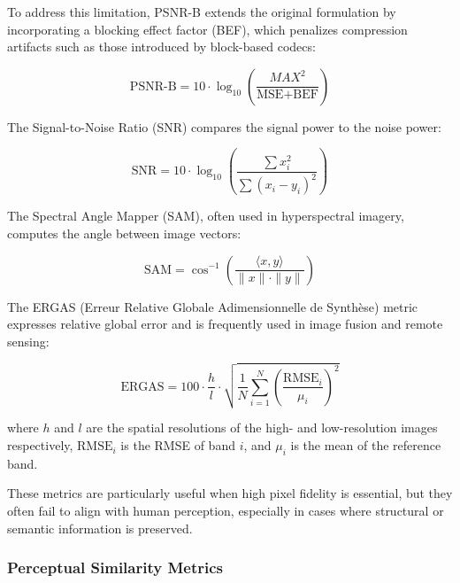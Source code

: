 To address this limitation, PSNR-B extends the original formulation by incorporating a blocking effect factor (BEF), which penalizes compression artifacts such as those introduced by block-based codecs:

\begin{equation}
\text{PSNR-B} = 10 \cdot \log_{10} \left( \frac{MAX^2}{\text{MSE} + \text{BEF}} \right)
\end{equation}

The Signal-to-Noise Ratio (SNR) compares the signal power to the noise power:

\begin{equation}
\text{SNR} = 10 \cdot \log_{10} \left( \frac{\sum x_i^2}{\sum {(x_i - y_i)}^2} \right)
\end{equation}

The Spectral Angle Mapper (SAM), often used in hyperspectral imagery, computes the angle between image vectors:

\begin{equation}
\text{SAM} = \cos^{-1} \left( \frac{\langle x, y \rangle}{\|x\| \cdot \|y\|} \right)
\end{equation}

The ERGAS (Erreur Relative Globale Adimensionnelle de Synthèse) metric expresses relative global error and is frequently used in image fusion and remote sensing:

\begin{equation}
\text{ERGAS} = 100 \cdot \frac{h}{l} \cdot \sqrt{ \frac{1}{N} \sum_{i=1}^{N} {\left( \frac{\text{RMSE}_i}{\mu_i} \right)}^2 }
\end{equation}

where \( h \) and \( l \) are the spatial resolutions of the high- and low-resolution images respectively, \( \text{RMSE}_i \) is the RMSE of band \( i \), and \( \mu_i \) is the mean of the reference band.

These metrics are particularly useful when high pixel fidelity is essential, but they often fail to align with human perception, especially in cases where structural or semantic information is preserved.


\subsubsection{Perceptual Similarity Metrics}\label{sec:perceptual_metrics}

